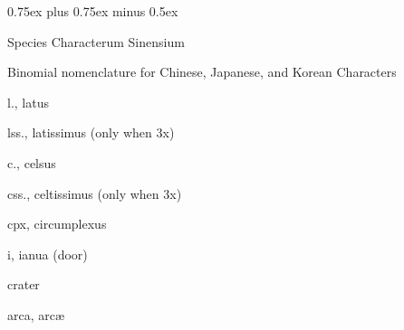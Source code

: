 
\mktsStyleNormal{}\spaceskip 0.75ex plus 0.75ex minus 0.5ex \relax%




{\mktsHOne{}Species Characterum Sinensium\mktsHOneBeg}%
{
}

\mktsIndent{}Binomial nomenclature for Chinese, Japanese, and Korean Characters

 {\mktsStyleItalic{}l.\/}, {\mktsStyleItalic{}latus\/}


 {\mktsStyleItalic{}lss.\/}, {\mktsStyleItalic{}latissimus\/} (only when {\mktsStyleItalic{}3x\/})


 {\mktsStyleItalic{}c.\/}, {\mktsStyleItalic{}celsus\/}


 {\mktsStyleItalic{}css.\/}, {\mktsStyleItalic{}celtissimus\/} (only when {\mktsStyleItalic{}3x\/})


 {\mktsStyleItalic{}cpx\/}, {\mktsStyleItalic{}circumplexus\/}


 {\mktsStyleItalic{}i\/}, {\mktsStyleItalic{}ianua\/} (door)


 {\mktsStyleItalic{}crater\/}


 {\mktsStyleItalic{}arca\/}, arcæ






